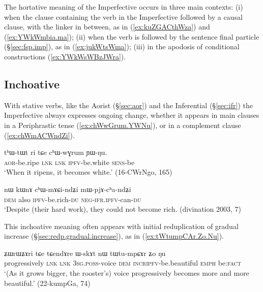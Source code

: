 The hortative meaning of the Imperfective occurs in three main contexts: (i) when the clause containing the verb in the Imperfective followed by a causal clause, with the linker  in between, as in (\ref{ex:kuZGACthWza}) and (\ref{ex:YWkWmbia.ma}); (ii) when the verb is followed by the sentence final particle  (§\ref{sec:fsp.imp}), as in (\ref{ex:jukWtsWma}); (iii) in the apodosis of conditional constructions (\ref{ex:YWkWsWBzJWra}).

\subsection{Inchoative} \label{sec:ipfv.inchoative}
With stative verbs, like the Aorist (§\ref{sec:aor}) and the Inferential (§\ref{sec:ifr}) the Imperfective always expresses ongoing change, whether it appears in main clauses in a Periphrastic tense (\ref{ex:chWwGrum.YWNu}), or in a complement clause (\ref{ex:chWmACWndZi}).

\begin{exe}
\ex \label{ex:chWwGrum.YWNu}
\gll tʰɯ-tɯt ri tɕe cʰɯ-wɣrum ɲɯ-ŋu. \\
\textsc{aor}-be.ripe \textsc{lnk} \textsc{lnk} \textsc{ipfv}-be.white \textsc{sens}-be \\
\glt `When it ripens, it becomes white.' (16-CWrNgo, 165)
\end{exe}

\begin{exe}
\ex \label{ex:chWmACWndZi}
\gll  nɯ kɯnɤ cʰɯ-mɤɕi-ndʑi mɯ-pjɤ-cʰa-ndʑi \\
\textsc{dem} also \textsc{ipfv}-be.rich-\textsc{du} \textsc{neg}-\textsc{ifr}.\textsc{ipfv}-can-\textsc{du} \\
\glt `Despite (their hard work), they could not become rich. (divination 2003, 7)
\end{exe}

This inchoative meaning often appears with initial reduplication of gradual increase (§\ref{sec:redp.gradual.increase}), as in (\ref{ex:tWtumpCAr.Zo.Nu}).

\begin{exe}
\ex \label{ex:tWtumpCAr.Zo.Nu}
\gll ʑɯrɯʑɤri tɕe tɕendɤre ɯ-skɤt nɯ tɯ\redp{}tu-mpɕɤr ʑo ŋu  \\
progressively \textsc{lnk} \textsc{lnk} \textsc{3sg}.\textsc{poss}-voice \textsc{dem} \textsc{incr}\redp{}\textsc{ipfv}-be.beautiful \textsc{emph} be:\textsc{fact} \\
\glt `(As it grows bigger, the rooster's) voice progressively becomes more and more beautiful.' (22-kumpGa, 74)
\end{exe}


